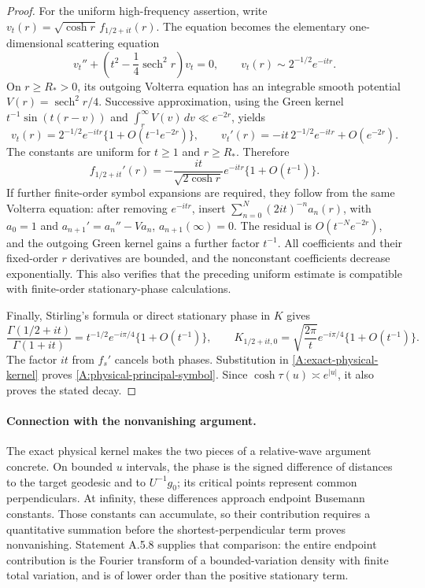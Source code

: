 \begin{proof}
For the uniform high-frequency assertion, write
$v_t(r)=\sqrt{\cosh r}\,f_{1/2+it}(r)$.
The equation becomes the elementary one-dimensional scattering equation
\[
 v_t''+\left(t^2-\frac14\operatorname{sech}^2r\right)v_t=0,
 \qquad v_t(r)\sim 2^{-1/2}e^{-itr}.
\]
On $r\geq R_*>0$, its outgoing Volterra equation has an
integrable smooth potential $V(r)=\operatorname{sech}^2r/4$.
Successive approximation, using the Green kernel
$t^{-1}\sin(t(r-v))$ and
$\int_r^\infty V(v)\,dv\ll e^{-2r}$, yields
\[
 v_t(r)=2^{-1/2}e^{-itr}
       \{1+O(t^{-1}e^{-2r})\},\qquad
 v_t'(r)=-it\,2^{-1/2}e^{-itr}+O(e^{-2r}).
\]
The constants are uniform for $t\geq1$ and $r\geq R_*$.
Therefore
\[
 f_{1/2+it}'(r)=
 -\frac{it}{\sqrt{2\cosh r}}e^{-itr}\{1+O(t^{-1})\}.
\]
If further finite-order symbol expansions are required, they follow
from the same Volterra equation: after removing $e^{-itr}$,
insert $\sum_{n=0}^N(2it)^{-n}a_n(r)$, with $a_0=1$ and
$a_{n+1}'=a_n''-Va_n$, $a_{n+1}(\infty)=0$.
The residual is $O(t^{-N}e^{-2r})$, and the outgoing Green kernel
gains a further factor $t^{-1}$. All coefficients and their fixed-order
$r$ derivatives are bounded, and the nonconstant coefficients decrease
exponentially. This also verifies that the preceding uniform
estimate is compatible with finite-order stationary-phase calculations.

Finally, Stirling's formula or direct stationary phase in $K$ gives
\[
 \frac{\Gamma(1/2+it)}{\Gamma(1+it)}
       =t^{-1/2}e^{-i\pi/4}\{1+O(t^{-1})\},\qquad
 K_{1/2+it,0}=
       \sqrt{\frac{2\pi}{t}}e^{-i\pi/4}\{1+O(t^{-1})\}.
\]
The factor $it$ from $f_s'$ cancels both phases.
Substitution in \eqref{A:exact-physical-kernel} proves
\eqref{A:physical-principal-symbol}. Since
$\cosh\tau(u)\asymp e^{|u|}$, it also proves the stated decay.
\end{proof}

\paragraph{Connection with the nonvanishing argument.}
The exact physical kernel makes the two pieces of a relative-wave
argument concrete. On bounded $u$ intervals, the phase is the signed
difference of distances to the target geodesic and to $U^{-1}g_0$;
its critical points represent common perpendiculars. At infinity,
these differences approach endpoint Busemann constants.
Those constants can accumulate, so their contribution requires a
quantitative summation before the shortest-perpendicular term
proves nonvanishing. Statement A.5.8 supplies that comparison:
the entire endpoint contribution is the Fourier transform of a
bounded-variation density with finite total variation, and is
of lower order than the positive stationary term.


